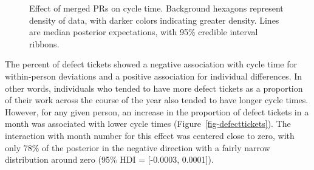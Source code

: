 \documentclass[manuscript,screen,review]{acmart}
\begin{document}
\begin{figure}


\caption[Merged PRs effect on cycle time]{\label{fig-mergedprs}Effect of
merged PRs on cycle time. Background hexagons represent density of data,
with darker colors indicating greater density. Lines are median
posterior expectations, with 95\% credible interval ribbons.}

\end{figure}%

The percent of defect tickets showed a negative association with cycle
time for within-person deviations and a positive association for
individual differences. In other words, individuals who tended to have
more defect tickets as a proportion of their work across the course of
the year also tended to have longer cycle times. However, for any given
person, an increase in the proportion of defect tickets in a month was
associated with lower cycle times (Figure~\ref{fig-defecttickets}). The
interaction with month number for this effect was centered close to
zero, with only 78\% of the posterior in the negative direction with a
fairly narrow distribution around zero (95\% HDI = {[}-0.0003,
0.0001{]}).
\end{document}

